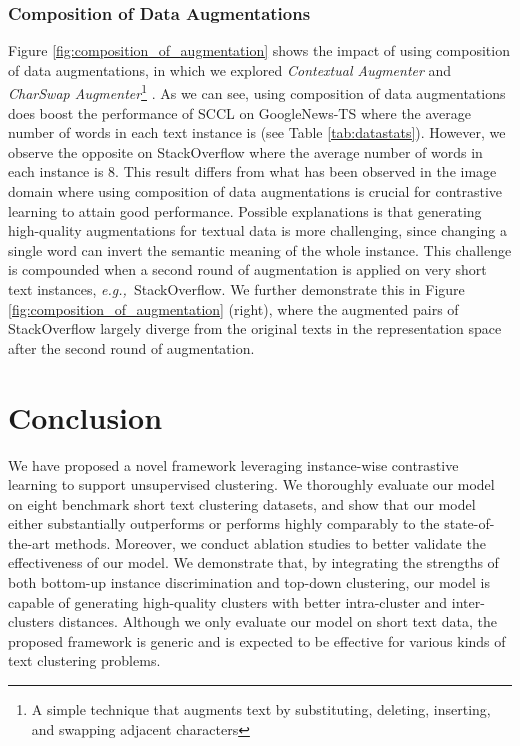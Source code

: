 \documentclass[11pt]{article}
\def\eg{{\em e.g.,~}}
\begin{document}
\subsubsection{Composition of Data Augmentations}
\label{subsec:comp_dataaug}
Figure \ref{fig:composition_of_augmentation} shows the impact of using composition of data augmentations, in which we explored \textit{Contextual Augmenter} and \textit{CharSwap Augmenter}\footnote{A simple technique that augments text by substituting, deleting, inserting, and swapping adjacent characters} \citep{morris2020textattack}.  As we can see, using composition of data augmentations does boost the performance of SCCL on GoogleNews-TS where the average number of words in each text instance is  (see Table \ref{tab:datastats}).
However, we observe the opposite on StackOverflow where the average number of words in each instance is 8. This result differs from what has been observed in the image domain where using composition of data augmentations is crucial for contrastive learning to attain good performance. Possible explanations is that generating high-quality augmentations for textual data is more challenging, since changing a single word can invert the semantic meaning of the whole instance. This challenge is compounded when a second round of augmentation is applied on very short text instances, \eg StackOverflow. We further demonstrate this in Figure \ref{fig:composition_of_augmentation} (right), where the augmented pairs of StackOverflow largely diverge from the original texts in the representation space after the second round of augmentation.  

\section{Conclusion}
We have proposed a novel framework leveraging instance-wise contrastive learning to support unsupervised clustering. We thoroughly evaluate our model on eight benchmark short text clustering datasets, and show that our model either  substantially outperforms or performs highly comparably to the state-of-the-art methods. Moreover, we conduct ablation studies to better validate the effectiveness of our model. We demonstrate that, by integrating the strengths of both bottom-up instance discrimination and  top-down clustering, our model is capable of generating high-quality clusters with better intra-cluster and inter-clusters distances. Although we only evaluate our model on short text data, the proposed framework is generic and is expected to be effective for various kinds of text clustering problems. 
\end{document}
